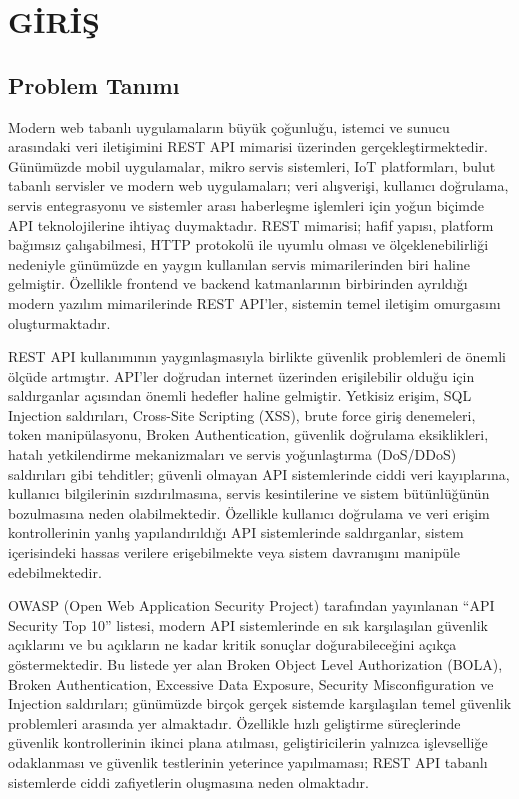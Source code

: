 \section{GİRİŞ}
\label{bolum1}

\subsection{Problem Tanımı}
\label{problem-tan-m}

Modern web tabanlı uygulamaların büyük çoğunluğu, istemci ve sunucu arasındaki veri iletişimini REST API mimarisi üzerinden gerçekleştirmektedir. Günümüzde mobil uygulamalar, mikro servis sistemleri, IoT platformları, bulut tabanlı servisler ve modern web uygulamaları; veri alışverişi, kullanıcı doğrulama, servis entegrasyonu ve sistemler arası haberleşme işlemleri için yoğun biçimde API teknolojilerine ihtiyaç duymaktadır. REST mimarisi; hafif yapısı, platform bağımsız çalışabilmesi, HTTP protokolü ile uyumlu olması ve ölçeklenebilirliği nedeniyle günümüzde en yaygın kullanılan servis mimarilerinden biri haline gelmiştir. Özellikle frontend ve backend katmanlarının birbirinden ayrıldığı modern yazılım mimarilerinde REST API’ler, sistemin temel iletişim omurgasını oluşturmaktadır.

REST API kullanımının yaygınlaşmasıyla birlikte güvenlik problemleri de önemli ölçüde artmıştır. API’ler doğrudan internet üzerinden erişilebilir olduğu için saldırganlar açısından önemli hedefler haline gelmiştir. Yetkisiz erişim, SQL Injection saldırıları, Cross-Site Scripting (XSS), brute force giriş denemeleri, token manipülasyonu, Broken Authentication, güvenlik doğrulama eksiklikleri, hatalı yetkilendirme mekanizmaları ve servis yoğunlaştırma (DoS/DDoS) saldırıları gibi tehditler; güvenli olmayan API sistemlerinde ciddi veri kayıplarına, kullanıcı bilgilerinin sızdırılmasına, servis kesintilerine ve sistem bütünlüğünün bozulmasına neden olabilmektedir. Özellikle kullanıcı doğrulama ve veri erişim kontrollerinin yanlış yapılandırıldığı API sistemlerinde saldırganlar, sistem içerisindeki hassas verilere erişebilmekte veya sistem davranışını manipüle edebilmektedir.

OWASP (Open Web Application Security Project) tarafından yayınlanan “API Security Top 10” listesi, modern API sistemlerinde en sık karşılaşılan güvenlik açıklarını ve bu açıkların ne kadar kritik sonuçlar doğurabileceğini açıkça göstermektedir. Bu listede yer alan Broken Object Level Authorization (BOLA), Broken Authentication, Excessive Data Exposure, Security Misconfiguration ve Injection saldırıları; günümüzde birçok gerçek sistemde karşılaşılan temel güvenlik problemleri arasında yer almaktadır. Özellikle hızlı geliştirme süreçlerinde güvenlik kontrollerinin ikinci plana atılması, geliştiricilerin yalnızca işlevselliğe odaklanması ve güvenlik testlerinin yeterince yapılmaması; REST API tabanlı sistemlerde ciddi zafiyetlerin oluşmasına neden olmaktadır.


